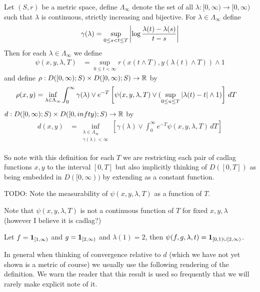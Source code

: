 \begin{defn}Let $(S,r)$ be a metric space, define $\Lambda_\infty$ denote the set of all $\lambda : [0,\infty) \to
  [0,\infty)$ such that $\lambda$ is continuous, strictly increasing and
  bijective.  For $\lambda \in \Lambda_\infty$ define
\begin{align*}
\gamma(\lambda) =
  \sup_{0 \leq s < t \leq T} \left \vert \log \frac{\lambda(t) -
      \lambda(s)}{t-s} \right \vert
\end{align*}
Then for each $\lambda \in \Lambda_\infty$ we define 
\begin{align*}
\psi(x,y,\lambda, T) &= \sup_{0 \leq t < \infty} r(x(t \wedge T), y(\lambda(t) \wedge T)) \wedge 1
\end{align*}
and define $\rho : D([0,\infty); S) \times D([0,\infty); S) \to  \mathbb{R}$ by 
\begin{align*}
\rho(x,y) &= \inf_{\lambda \in \Lambda_\infty} 
\int_0^\infty \gamma(\lambda) \vee e^{-T} \left[ \psi(x,y,\lambda,T) \vee (\sup_{0 \leq u \leq T}\left \vert \lambda(t) - t \right \vert \wedge 1) \right] \, dT 
\end{align*}
$d : D([0,\infty); S) \times D([0,infty); S) \to  \mathbb{R}$ by 
\begin{align*}
d(x,y) &= \inf_{\substack{\lambda \in \Lambda_\infty \\
\gamma(\lambda) < \infty}} 
\left[ \gamma(\lambda) \vee \int_0^\infty e^{-T} \psi(x,y,\lambda,T) \, dT \right]
\end{align*}
\end{defn}
So note with this definition for each $T$ we are restricting each pair of cadlag functions $x,y$ to the interval $[0,T]$ but also
implicitly thinking of $D([0,T])$ as being embedded in $D([0,\infty))$ by extending as a constant function.

TODO: Note the measurability of $\psi(x,y,\lambda,T)$ as a function of $T$.

Note that $\psi(x,y,\lambda,T)$ is not a continuous function of $T$ for fixed $x,y,\lambda$ (however I believe it is cadlag?)
\begin{examp}
Let $f = \textbf{1}_{[1, \infty)}$ and $g = \textbf{1}_{[2, \infty)}$ and $\lambda(1) = 2$, then $\psi(f,g,\lambda,t) = \textbf{1}_{[0,1) \cup [2,\infty)}$.
\end{examp}

In general when thinking of convergence relative to $d$ (which we have not yet shown is a metric of course) we usually use 
the following rendering of the definition.  We warn the reader that this result is used so frequently that we will rarely make explicit note
of it.

